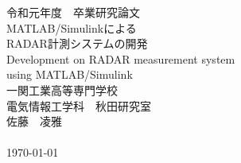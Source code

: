 \begin{center}
    {\Large 令和元年度　卒業研究論文} \\[3.5truecm]
    \huge MATLAB/Simulinkによる\\RADAR計測システムの開発\\
    \LARGE Development on RADAR measurement system\\using MATLAB/Simulink\\[4truecm]
    \Large 一関工業高等専門学校\\
    電気情報工学科　秋田研究室\\
    佐藤　凌雅\\
    　\\
    \today
\end{center}